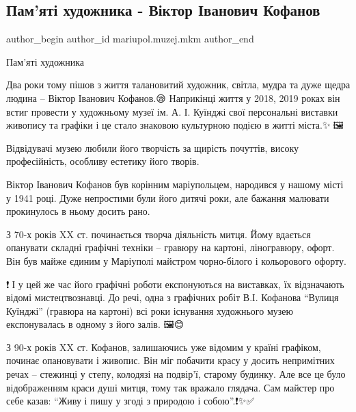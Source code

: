  
 
 
 
 

\subsection{Пам'яті художника - Віктор Іванович Кофанов}
\label{sec:15_06_2023.fb.mariupol.muzej.mkm.1.viktor_ivanovych_kofanov}

\ifcmt
 author_begin
   author_id mariupol.muzej.mkm
 author_end
\fi

Пам'яті художника

Два роки тому пішов з життя талановитий художник, світла, мудра та дуже щедра
людина – Віктор Іванович Кофанов.😪 Наприкінці життя у 2018, 2019 роках він
встиг провести у художньому музеї ім. А. І. Куїнджі свої персональні виставки
живопису та графіки і це стало знаковою  культурною подією в житті міста.✨️🎉🖼

Відвідувачі музею любили його творчість за щирість почуттів, високу
професійність, особливу естетику його творів. 🎨🥰

Віктор Іванович Кофанов був корінним маріупольцем, народився у нашому місті у
1941 році. Дуже непростими були його дитячі роки, але бажання малювати
прокинулось в ньому досить рано. 👏💗

З 70-х років XX ст. починається творча діяльність митця. Йому вдається
опанувати складні графічні техніки – гравюру на картоні, ліногравюру, офорт.
Він був майже єдиним у Маріуполі  майстром чорно-білого і кольорового офорту.

❗️👏І у цей же час його графічні роботи експонуються на виставках, їх
відзначають відомі мистецтвознавці. До речі, одна з графічних робіт В.І.
Кофанова \enquote{Вулиця Куїнджі} (гравюра на картоні)  всі роки існування художнього
музею експонувалась в одному з його залів. 🖼😊

З 90-х років  XX ст.  Кофанов, залишаючись уже відомим у країні графіком,
починає опановувати і живопис. Він міг побачити красу у досить непримітних
речах – стежинці у степу, колодязі на подвір'ї, старому будинку. Але все це
було відображенням краси душі митця, тому так вражало глядача. Сам майстер про
себе казав: \enquote{Живу і пишу у згоді з природою і собою}.❗️✨️✅️


